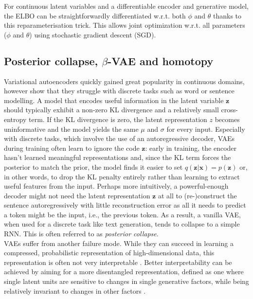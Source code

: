 \documentclass[Main.tex]{subfiles}
\begin{document}
For continuous latent variables and a differentiable encoder and generative model, the ELBO can be straightforwardly differentiated w.r.t. both $\phi$ and $\theta$ thanks to this reparameterisation trick. This allows joint optimization w.r.t. all parameters ($\phi$ and $\theta$) using stochastic gradient descent (SGD).\\

\subsection{Posterior collapse, $\beta$-VAE and homotopy}
Variational autoencoders quickly gained great popularity in continuous domains, however \cite{bowman_generating_2016} show that they struggle with discrete tasks such as word or sentence modelling. A model that encodes useful information in the latent variable $\mathbf{z}$ should typically exhibit a non-zero KL divergence and a relatively small cross-entropy term. If the KL divergence is zero, the latent representation $z$ becomes uninformative and the model yields the same $\mu$ and $\sigma$ for every input. Especially with discrete tasks, which involve the use of an autoregressive decoder, VAEs during training often learn to ignore the code $\mathbf{z}$: early in training, the encoder hasn't learned meaningful representations and, since the KL term forces the posterior to match the prior, the model finds it easier to set \(q(\mathbf{z}|\mathbf{x}) = p(\mathbf{z})\) or, in other words, to drop the KL penalty entirely rather than learning to extract useful features from the input. Perhaps more intuitively, a powerful-enough decoder might not need the latent representation $\mathbf{z}$ at all to (re-)construct the sentence autoregressively with little reconstruction error as all it needs to predict a token might be the input, i.e., the previous token. As a result, a vanilla VAE, when used for a discrete task like text generation, tends to collapse to a simple RNN. This is often referred to as \textit{posterior collapse}.\\

VAEs suffer from another failure mode. While they can succeed in learning a compressed, probabilistic representation of high-dimensional data, this representation is often not very interpretable \cite{higgins_-vae_2017}. Better interpretability can be achieved by aiming for a more disentangled representation, defined as one where single latent units are sensitive to changes in single generative factors, while being relatively invariant to changes in other factors \cite{bengio_representation_2014}.\\
\end{document}
